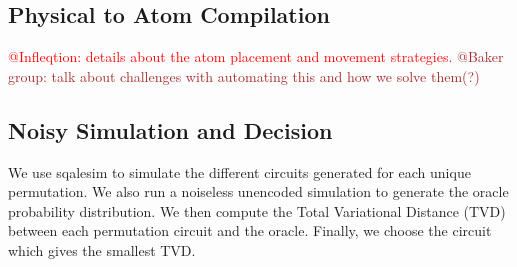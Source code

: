 \subsection{Physical to Atom Compilation}
\textcolor{red}{@Infleqtion: details about the atom placement and movement strategies.}
\textcolor{brown}{@Baker group: talk about challenges with automating this and how we solve them(?)}

\subsection{Noisy Simulation and Decision}
We use sqalesim\cite{} to simulate the different circuits generated for each unique permutation. We also run a noiseless unencoded simulation to generate the oracle probability distribution. We then compute the Total Variational Distance (TVD) between each permutation circuit and the oracle. Finally, we choose the circuit which gives the smallest TVD\@.
